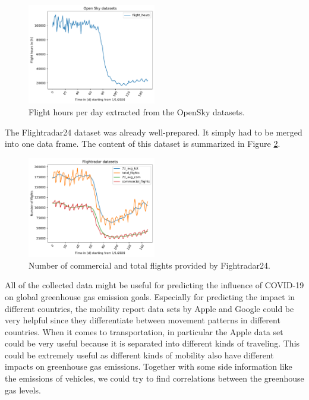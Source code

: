 \begin{figure}[h]
\centering
\includegraphics[width=0.5\textwidth]{mobility/opensky_demo.pdf}
\caption{Flight hours per day extracted from the OpenSky datasets.}
\label{opensky_demo}
\end{figure}

The Flightradar24 dataset was already well-prepared. It simply had to be merged into one data frame. The content of this dataset is summarized in Figure \ref{flightradar_demo}. 

\begin{figure}[h]
\centering
\includegraphics[width=0.5\textwidth]{mobility/flightradar_demo.pdf}
\caption{Number of commercial and total flights provided by Fightradar24.}
\label{flightradar_demo}
\end{figure}

All of the collected data might be useful for predicting the influence of COVID-19 on global greenhouse gas emission goals. Especially for predicting the impact in different countries, the mobility report data sets by Apple and Google could be very helpful since they differentiate between movement patterns in different countries. When it comes to transportation, in particular the Apple data set could be very useful because it is separated into different kinds of traveling. This could be extremely useful as different kinds of mobility also have different impacts on greenhouse gas emissions. Together with some side information like the emissions of vehicles, we could try to find correlations between the greenhouse gas levels.

